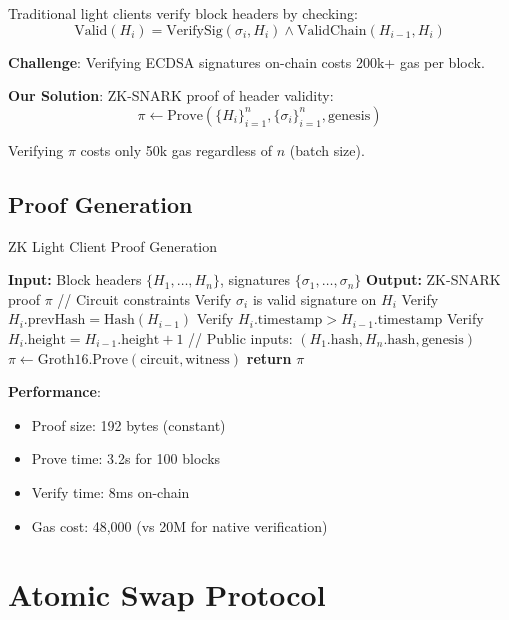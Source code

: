 \documentclass[11pt]{article}
\begin{document}
Traditional light clients verify block headers by checking:
\begin{equation}
\text{Valid}(H_i) = \text{VerifySig}(\sigma_i, H_i) \land \text{ValidChain}(H_{i-1}, H_i)
\end{equation}

\textbf{Challenge}: Verifying ECDSA signatures on-chain costs 200k+ gas per block.

\textbf{Our Solution}: ZK-SNARK proof of header validity:
\begin{equation}
\pi \leftarrow \text{Prove}\left(\{H_i\}_{i=1}^n, \{\sigma_i\}_{i=1}^n, \text{genesis}\right)
\end{equation}

Verifying $\pi$ costs only 50k gas regardless of $n$ (batch size).

\subsection{Proof Generation}

\begin{algorithm}[H]
\caption{ZK Light Client Proof Generation}
\begin{algorithmic}[1]
\State \textbf{Input:} Block headers $\{H_1, \ldots, H_n\}$, signatures $\{\sigma_1, \ldots, \sigma_n\}$
\State \textbf{Output:} ZK-SNARK proof $\pi$
\State
\State // Circuit constraints
  \State Verify $\sigma_i$ is valid signature on $H_i$
  \State Verify $H_i.\text{prevHash} = \text{Hash}(H_{i-1})$
  \State Verify $H_i.\text{timestamp} > H_{i-1}.\text{timestamp}$
  \State Verify $H_i.\text{height} = H_{i-1}.\text{height} + 1$
\EndFor
\State
\State // Public inputs: $(H_1.\text{hash}, H_n.\text{hash}, \text{genesis})$
\State $\pi \leftarrow \text{Groth16.Prove}(\text{circuit}, \text{witness})$
\State \textbf{return} $\pi$
\end{algorithmic}
\end{algorithm}

\textbf{Performance}:
\begin{itemize}[leftmargin=1.1em]
  \item Proof size: 192 bytes (constant)
  \item Prove time: 3.2s for 100 blocks
  \item Verify time: 8ms on-chain
  \item Gas cost: 48,000 (vs 20M for native verification)
\end{itemize}

\section{Atomic Swap Protocol}
\end{document}
